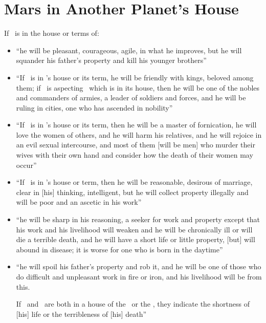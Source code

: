 \section{Mars in Another Planet's House}
If \Mars\, is in the house or terms of:
\begin{itemize}[topsep=0em,itemsep=0em]
\item[\Saturn] ``he will be pleasant, courageous, agile, in what he improves, but he will squander his father's property and kill his younger brothers''

\item[\Jupiter] ``If \Mars\, is in \Jupiter's house or its term, he will be friendly with kings, beloved among them; if \Jupiter\, is aspecting \Mars\, which is in its house, then he will be one of the nobles and commanders of armies, a leader of soldiers and forces, and he will be ruling in cities, one who has ascended in nobility''

\item[\Venus] ``If \Mars\, is in \Venus's house or its term, then he will be a master of fornication, he will love the women of others, and he will harm his relatives, and he will rejoice in an evil sexual intercourse, and most of them [will be men] who murder their wives with their own hand and consider how the death of their women may occur''

\item[\Mercury] ``If \Mars\, is in \Mercury's house or term, then he will be reasonable, desirous of marriage, clear in [his] thinking, intelligent, but he will collect property illegally and will be poor and an ascetic in his work''

\item[\Moon] ``he will be sharp in his reasoning, a seeker for work and property except that his work and his livelihood will weaken and he will be chronically ill or will die a terrible death, and he will have a short life or little property, [but] will abound in disease; it is worse for one who is born in the daytime''

\item[\Sun] ``he will spoil his father's property and rob it, and he will be one of those who do difficult and unpleasant work in fire or iron, and his livelihood will be from this. 

If \Mars\, and \Saturn\, are both in a house of the \Sun\, or the \Moon, they indicate the shortness of [his] life or the terribleness of [his] death''
\end{itemize}